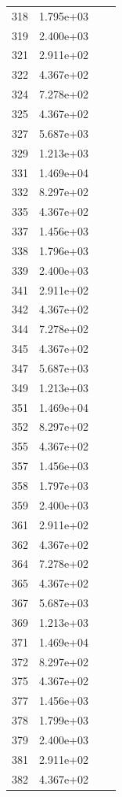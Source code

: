 \documentclass[12pt]{article}
\begin{document}
\begin{longtable}{@{}cccc@{}}
318 & 1.795e+03 &  &  \\
319 & 2.400e+03 &  &  \\
321 & 2.911e+02 &  &  \\
322 & 4.367e+02 &  &  \\
324 & 7.278e+02 &  &  \\
325 & 4.367e+02 &  &  \\
327 & 5.687e+03 &  &  \\
329 & 1.213e+03 &  &  \\
331 & 1.469e+04 &  &  \\
332 & 8.297e+02 &  &  \\
335 & 4.367e+02 &  &  \\
337 & 1.456e+03 &  &  \\
338 & 1.796e+03 &  &  \\
339 & 2.400e+03 &  &  \\
341 & 2.911e+02 &  &  \\
342 & 4.367e+02 &  &  \\
344 & 7.278e+02 &  &  \\
345 & 4.367e+02 &  &  \\
347 & 5.687e+03 &  &  \\
349 & 1.213e+03 &  &  \\
351 & 1.469e+04 &  &  \\
352 & 8.297e+02 &  &  \\
355 & 4.367e+02 &  &  \\
357 & 1.456e+03 &  &  \\
358 & 1.797e+03 &  &  \\
359 & 2.400e+03 &  &  \\
361 & 2.911e+02 &  &  \\
362 & 4.367e+02 &  &  \\
364 & 7.278e+02 &  &  \\
365 & 4.367e+02 &  &  \\
367 & 5.687e+03 &  &  \\
369 & 1.213e+03 &  &  \\
371 & 1.469e+04 &  &  \\
372 & 8.297e+02 &  &  \\
375 & 4.367e+02 &  &  \\
377 & 1.456e+03 &  &  \\
378 & 1.799e+03 &  &  \\
379 & 2.400e+03 &  &  \\
381 & 2.911e+02 &  &  \\
382 & 4.367e+02 &  &  \\

\end{longtable}
\end{document}
